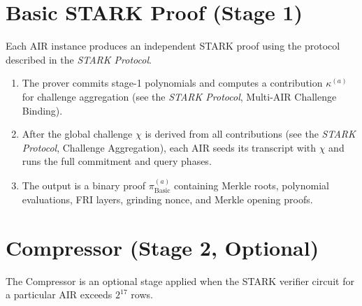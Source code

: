 \section{Basic STARK Proof (Stage 1)}
\label{sec:basic}

Each AIR instance produces an independent STARK proof using the protocol
described in the \emph{STARK Protocol}.

\begin{enumerate}[label=(\roman*)]
  \item The prover commits stage-1 polynomials and computes a
        contribution $\kappa^{(a)}$ for challenge aggregation
        (see the \emph{STARK Protocol}, Multi-AIR Challenge Binding).

  \item After the global challenge $\chi$ is derived from all contributions
        (see the \emph{STARK Protocol}, Challenge Aggregation),
        each AIR seeds its transcript with $\chi$ and runs the full
        commitment and query phases.

  \item The output is a binary proof $\pi^{(a)}_{\mathrm{Basic}}$
        containing Merkle roots, polynomial evaluations,
        FRI layers, grinding nonce, and Merkle opening proofs.
\end{enumerate}

\section{Compressor (Stage 2, Optional)}
\label{sec:compressor}

The Compressor is an optional stage applied when the STARK verifier circuit
for a particular AIR exceeds $2^{17}$ rows.

